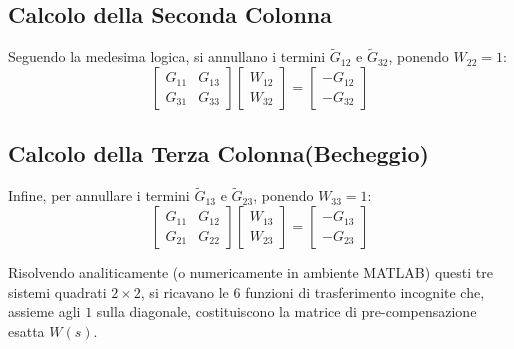\subsection{Calcolo della Seconda Colonna}
Seguendo la medesima logica, si annullano i termini $\tilde{G}_{12}$ e $\tilde{G}_{32}$, ponendo $W_{22} = 1$:
\begin{equation}
	\begin{bmatrix}
		G_{11} & G_{13} \\ 
		G_{31} & G_{33}
	\end{bmatrix}
	\begin{bmatrix}
		W_{12} \\ 
		W_{32}
	\end{bmatrix}
	=
	\begin{bmatrix}
		-G_{12} \\ 
		-G_{32}
	\end{bmatrix}
\end{equation}

\subsection{Calcolo della Terza Colonna(Becheggio)}
Infine, per annullare i termini $\tilde{G}_{13}$ e $\tilde{G}_{23}$, ponendo $W_{33} = 1$:
\begin{equation}
	\begin{bmatrix}
		G_{11} & G_{12} \\ 
		G_{21} & G_{22}
	\end{bmatrix}
	\begin{bmatrix}
		W_{13} \\ 
		W_{23}
	\end{bmatrix}
	=
	\begin{bmatrix}
		-G_{13} \\ 
		-G_{23}
	\end{bmatrix}
\end{equation}

Risolvendo analiticamente (o numericamente in ambiente MATLAB) questi tre sistemi quadrati $2 \times 2$, si ricavano le 6 funzioni di trasferimento incognite che, assieme agli $1$ sulla diagonale, costituiscono la matrice di pre-compensazione esatta $W(s)$.
